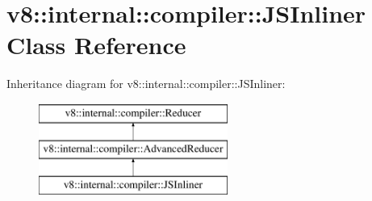 \hypertarget{classv8_1_1internal_1_1compiler_1_1JSInliner}{}\section{v8\+:\+:internal\+:\+:compiler\+:\+:J\+S\+Inliner Class Reference}
\label{classv8_1_1internal_1_1compiler_1_1JSInliner}
Inheritance diagram for v8\+:\+:internal\+:\+:compiler\+:\+:J\+S\+Inliner\+:\begin{figure}[H]
\begin{center}
\leavevmode
\includegraphics[height=3.000000cm]{classv8_1_1internal_1_1compiler_1_1JSInliner}
\end{center}
\end{figure}
